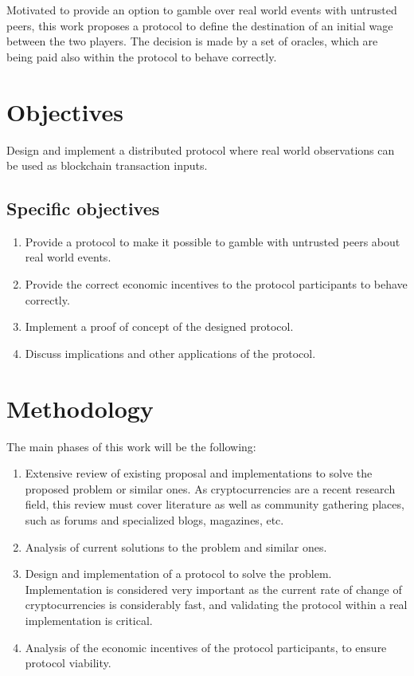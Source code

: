 Motivated to provide an option to gamble over real world events with untrusted
 peers,
this work proposes a protocol to define the destination of an initial wage
  between the two players.
The decision is made by a set of oracles, which are being paid also within the
  protocol to behave correctly.

\section{Objectives}
Design and implement a distributed protocol where real world observations can
  be used as blockchain transaction inputs.

\subsection{Specific objectives}
\begin{enumerate}
	\item Provide a protocol to make it possible to gamble with untrusted peers
	  about real world events.
	\item Provide the correct economic incentives to the protocol participants to
	  behave correctly.
	\item Implement a proof of concept of the designed protocol.
	\item Discuss implications and other applications of the protocol.
\end{enumerate}

\section{Methodology}
The main phases of this work will be the following:
\begin{enumerate}
	\item Extensive review of existing proposal and implementations to solve
	  the proposed pro\-blem or similar ones. As cryptocurrencies are a recent
	  research field, this review must cover literature as well as
	  community gathering places, such as forums and specialized blogs,
	  magazines, etc.
  \item Analysis of current solutions to the problem and similar ones.
  \item Design and implementation of a protocol to solve the problem.
    Implementation is considered very important as the current rate of change
    of cryptocurrencies is considerably fast, and validating the protocol within
    a real implementation is critical.
  \item Analysis of the economic incentives of the protocol participants, to
    ensure protocol viability.
\end{enumerate}

